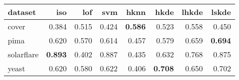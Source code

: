 \begin{tabular}{l|rrr|rrrr}
  \toprule
dataset & iso & lof & svm & hknn & hkde & lhkde & lskde \\ 
  \midrule
cover & 0.384 & 0.515 & 0.424 & {\bf 0.586} & 0.523 & 0.558 & 0.450 \\ 
  pima & 0.620 & 0.570 & 0.614 & 0.457 & 0.579 & 0.659 & {\bf 0.694} \\ 
  solarflare & {\bf 0.893} & 0.402 & 0.887 & 0.435 & 0.632 & 0.768 & 0.875 \\ 
  yeast & 0.620 & 0.580 & 0.622 & 0.406 & {\bf 0.708} & 0.650 & 0.702 \\ 
   \bottomrule
\end{tabular}
